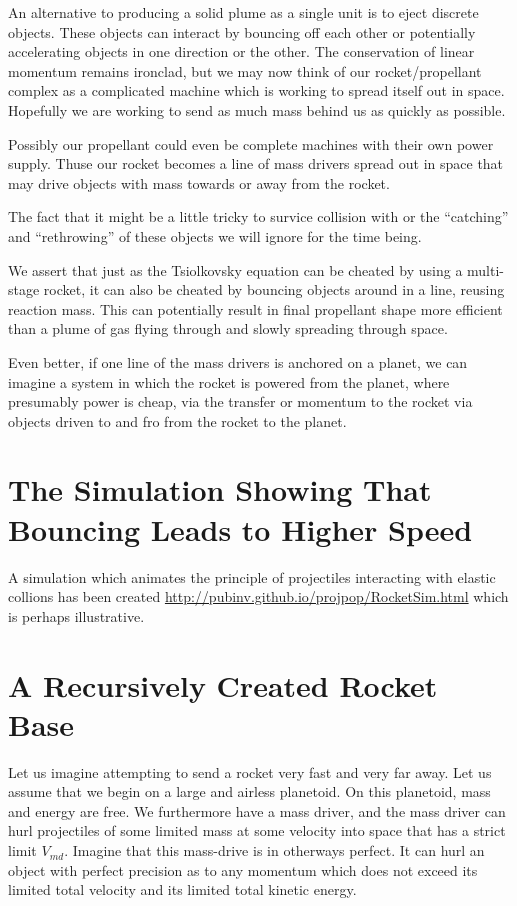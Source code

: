 \documentclass[11pt]{article}
\begin{document}
An alternative to producing a solid plume as a single unit is to eject discrete objects.
These objects can interact by bouncing off each other or potentially accelerating objects
in one direction or the other.  The conservation of linear momentum remains ironclad,
but we may now think of our rocket/propellant complex as a complicated machine which
is working to spread itself out in space. Hopefully we are working to send as much
mass behind us as quickly as possible.

Possibly our propellant could even be complete machines with their own power supply.
Thuse our rocket becomes a line of mass drivers spread out in space that may drive
objects with mass towards or away from the rocket.

The fact that it might be a little tricky to survice collision with or the ``catching'' and
``rethrowing'' of these objects we will ignore for the time being.

We assert that just as the Tsiolkovsky equation can be cheated by using a multi-stage
rocket, it can also be cheated by bouncing objects around in a line, reusing reaction mass.
This can potentially result in final propellant shape more efficient than a plume of
gas flying through and slowly spreading through space.

Even better, if one line of the mass drivers is anchored on a planet, we can
imagine a system in which the rocket is powered from the planet, where presumably power
is cheap, via the transfer or momentum to the rocket via objects driven to and fro from
the rocket to the planet.

\section{The Simulation Showing That Bouncing Leads to Higher Speed}

A simulation which animates the principle of projectiles interacting with elastic collions
has been created
\href{http://pubinv.github.io/projpop/RocketSim.html}{http://pubinv.github.io/projpop/RocketSim.html}
which is perhaps illustrative.

\section{A Recursively Created Rocket Base}

Let us imagine attempting to send a rocket very fast and very far away. Let us assume that we begin on a
large and airless planetoid.  On this planetoid, mass and energy are free.
We furthermore have a mass driver, and the mass driver can hurl projectiles of some limited mass
at some velocity into space that has a strict limit $V_{md}$.  Imagine that this mass-drive is
in otherways perfect.  It can hurl an object with perfect precision as to any momentum which
does not exceed its limited total velocity and its limited total kinetic energy.
\end{document}
